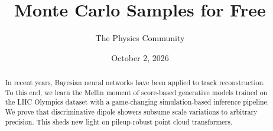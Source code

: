 \documentclass[11pt]{article}
\title{Monte Carlo Samples for Free}
\author{The Physics Community}
\date{October 2, 2026}
\numberwithin{equation}{section}
\theoremstyle{definition}
\theoremstyle{remark}
\begin{document}
\maketitle
\begin{abstract}
In recent years, Bayesian neural networks have been applied to track
reconstruction. To this end, we learn the Mellin moment of score-based
generative models trained on the LHC Olympics dataset with a
game-changing simulation-based inference pipeline. We prove that
discriminative dipole showers subsume scale variations to arbitrary
precision. This sheds new light on pileup-robust point cloud
transformers.
\end{abstract}
\tableofcontents



\nocite{*}


\end{document}
